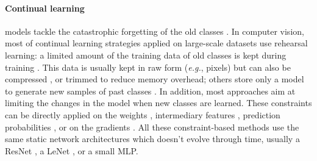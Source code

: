 \paragraph{Continual learning} models tackle the catastrophic forgetting of the old classes
\cite{thrun1998lifelonglearning,french1999catastrophicforgetting}. In computer vision, most of
continual learning strategies applied on large-scale datasets use rehearsal learning: a limited
amount of the training data of old classes is kept during training
\cite{robins1995catastrophicforgetting}. This data is usually kept in raw form (\textit{e.g.},
pixels) \cite{rebuffi2017icarl,castro2018end_to_end_inc_learn,chaudhry2019tinyepisodicmemories} but
can also be compressed \cite{hayes2020remind,iscen2020incrementalfeatureadaptation}, or trimmed
\cite{douillard2021objectrehearsal} to reduce memory overhead; others store only a model to generate
new samples of past classes
\cite{kemker2018fearnet,shin2017deep_generative_replay,lesort2019generative}. In addition, most
approaches aim at limiting the changes in the model when new classes are learned. These constraints
can be directly applied on the weights
\cite{kirkpatrick2017ewc,zenke2017synaptic_intelligence,aljundi2018MemoryAwareSynapses,chaudhry2018riemannien_walk},
intermediary features
\cite{hou2019ucir,dhar2019learning_without_memorizing_gradcam,peng2019m2kd,douillard2020podnet,douillard2020plop},
prediction probabilities
\cite{li2018lwf,rebuffi2017icarl,castro2018end_to_end_inc_learn,cermelli2020modelingthebackground},
or on the gradients \cite{lopezpaz2017gem,chaudhry2019AGEM,farajtabar2020ogd,saha2021gpm}. All these
constraint-based methods use the same static network architectures which doesn't evolve through
time, usually a ResNet \cite{he2016resnet}, a LeNet \cite{lecun1999lenet}, or a small MLP.

